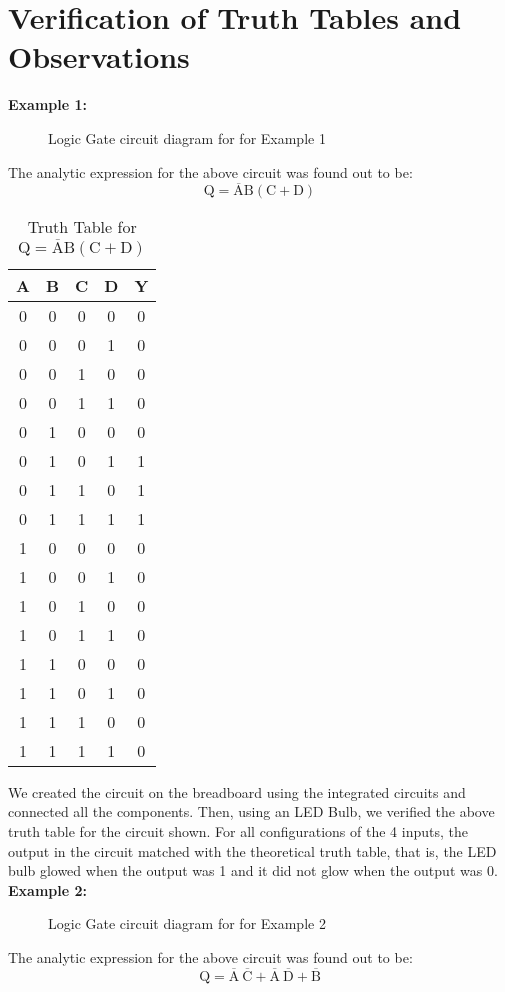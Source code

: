 \documentclass{scrartcl}
\begin{document}
\section{Verification of Truth Tables and Observations}
\textbf{Example 1:}
\begin{figure}[H]
    \centering
    
    \caption{Logic Gate circuit diagram for for Example 1}
\end{figure}
The analytic expression for the above circuit was found out to be: $$\mathrm{Q = \overline{A}B(C+D)}$$
\begin{table}[H]
    \centering
    \caption{Truth Table for \( \mathrm{Q} = \overline{\mathrm{A}}\mathrm{B}(\mathrm{C + D}) \)}
    \vspace{0.2cm}
    \begin{tabular}{|c|c|c|c||c|}
    \hline
    \textbf{A} & \textbf{B} & \textbf{C} & \textbf{D} & \textbf{Y} \\
    \hline
    0 & 0 & 0 & 0 & 0 \\
    0 & 0 & 0 & 1 & 0 \\
    0 & 0 & 1 & 0 & 0 \\
    0 & 0 & 1 & 1 & 0 \\
    0 & 1 & 0 & 0 & 0 \\
    0 & 1 & 0 & 1 & 1 \\
    0 & 1 & 1 & 0 & 1 \\
    0 & 1 & 1 & 1 & 1 \\
    1 & 0 & 0 & 0 & 0 \\
    1 & 0 & 0 & 1 & 0 \\
    1 & 0 & 1 & 0 & 0 \\
    1 & 0 & 1 & 1 & 0 \\
    1 & 1 & 0 & 0 & 0 \\
    1 & 1 & 0 & 1 & 0 \\
    1 & 1 & 1 & 0 & 0 \\
    1 & 1 & 1 & 1 & 0 \\
    \hline
    \end{tabular}
    \end{table}
    \noindent
    We created the circuit on the breadboard using the integrated circuits and connected all the components. Then, using an LED Bulb, we verified the above truth table for the circuit shown. For all configurations of the 4 inputs, the output in the circuit matched with the theoretical truth table, that is, the LED bulb glowed when the output was 1 and it did not glow when the output was 0. \\[0.2cm]
    \textbf{Example 2:}  
    \begin{figure}[H]
    \centering
    
    \caption{Logic Gate circuit diagram for for Example 2}

\end{figure}
The analytic expression for the above circuit was found out to be: 
$$\mathrm{Q = \overline{A}\ \overline{C}+ \overline{A}\ \overline{D} + \overline{B}}$$
\end{document}

